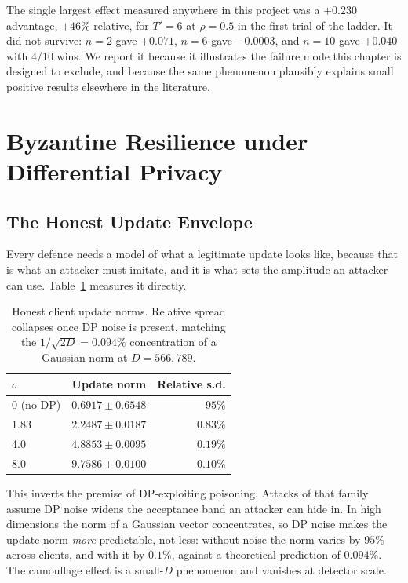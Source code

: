 The single largest effect measured anywhere in this project was a $+0.230$
advantage, $+46\%$ relative, for $T'=6$ at $\rho=0.5$ in the first trial of the
ladder. It did not survive: $n=2$ gave $+0.071$, $n=6$ gave $-0.0003$, and
$n=10$ gave $+0.040$ with 4/10 wins. We report it because it illustrates the
failure mode this chapter is designed to exclude, and because the same
phenomenon plausibly explains small positive results elsewhere in the
literature.

\section{Byzantine Resilience under Differential Privacy}
\label{sec:p3-results}

\subsection{The Honest Update Envelope}
\label{sec:p3-envelope}

Every defence needs a model of what a legitimate update looks like, because that
is what an attacker must imitate, and it is what sets the amplitude an attacker
can use. Table~\ref{tab:envelope} measures it directly.

\begin{table}[H]
\centering
\caption{Honest client update norms. Relative spread collapses once DP noise is
present, matching the $1/\sqrt{2D}=0.094\%$ concentration of a Gaussian norm at
$D=566{,}789$.}
\label{tab:envelope}
\begin{tabular}{lrr}
\toprule
$\sigma$ & Update norm & Relative s.d. \\
\midrule
0 (no DP) & $0.6917\pm0.6548$ & $95\%$ \\
1.83 & $2.2487\pm0.0187$ & $0.83\%$ \\
4.0 & $4.8853\pm0.0095$ & $0.19\%$ \\
8.0 & $9.7586\pm0.0100$ & $0.10\%$ \\
\bottomrule
\end{tabular}
\end{table}

This inverts the premise of DP-exploiting poisoning. Attacks of that family
assume DP noise widens the acceptance band an attacker can hide in. In high
dimensions the norm of a Gaussian vector concentrates, so DP noise makes the
update norm \emph{more} predictable, not less: without noise the norm varies by
$95\%$ across clients, and with it by $0.1\%$, against a theoretical prediction
of $0.094\%$. The camouflage effect is a small-$D$ phenomenon and vanishes at
detector scale.

